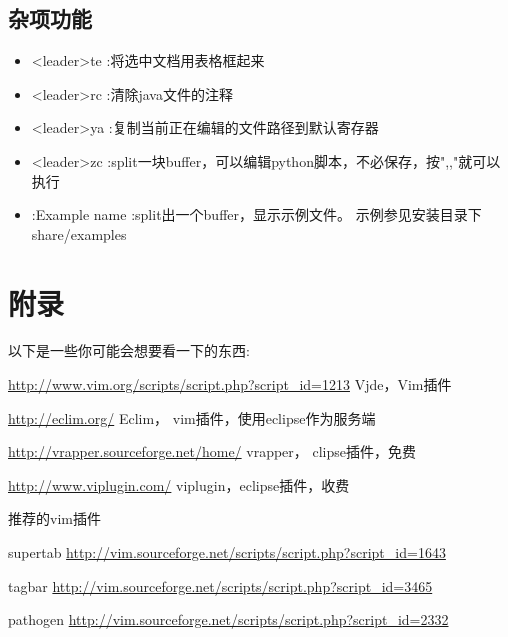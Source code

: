 \documentclass[oneside,openany]{book}
\begin{document}
\section{杂项功能}
  \begin{itemize}
        \item <leader>te  :将选中文档用表格框起来
        \item <leader>rc  :清除java文件的注释
        \item <leader>ya  :复制当前正在编辑的文件路径到默认寄存器
        \item <leader>zc  :split一块buffer，可以编辑python脚本，不必保存，按",,"就可以执行
        \item :Example name  :split出一个buffer，显示示例文件。 示例参见安装目录下share/examples
  \end{itemize}
    

\chapter{附录}
  以下是一些你可能会想要看一下的东西:
  \newline

  \href{http://www.vim.org/scripts/script.php?script\_id=1213}{http://www.vim.org/scripts/script.php?script\_id=1213} 
  Vjde，Vim插件
  \newline

  \href{http://eclim.org/}{http://eclim.org/} Eclim， vim插件，使用eclipse作为服务端
  \newline

  \href{http://vrapper.sourceforge.net/home/}{http://vrapper.sourceforge.net/home/}
  vrapper， clipse插件，免费
  \newline

  \href{http://www.viplugin.com/}{http://www.viplugin.com/}
  viplugin，eclipse插件，收费
  \newline

  推荐的vim插件

  supertab
  \href{http://vim.sourceforge.net/scripts/script.php?script\_id=1643}
   {http://vim.sourceforge.net/scripts/script.php?script\_id=1643}

  tagbar
  \href{http://vim.sourceforge.net/scripts/script.php?script\_id=3465}
   {http://vim.sourceforge.net/scripts/script.php?script\_id=3465}

  pathogen
  \href{http://vim.sourceforge.net/scripts/script.php?script\_id=2332}
   {http://vim.sourceforge.net/scripts/script.php?script\_id=2332}
\end{document}
